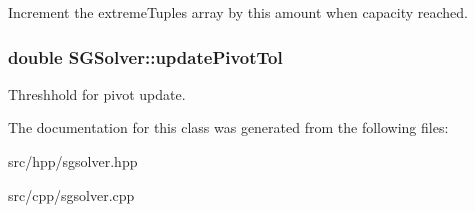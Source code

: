 Increment the extreme\+Tuples array by this amount when capacity reached. \hypertarget{class_s_g_solver_a04879f5038b676bd1a947966750532ad}{
\subsubsection[{update\+Pivot\+Tol}]{\setlength{\rightskip}{0pt plus 5cm}double S\+G\+Solver\+::update\+Pivot\+Tol\hspace{0.3cm}{\ttfamily [private]}}}\label{class_s_g_solver_a04879f5038b676bd1a947966750532ad}
Threshhold for pivot update. 

The documentation for this class was generated from the following files\+:\begin{DoxyCompactItemize}
\item 
src/hpp/sgsolver.\+hpp\item 
src/cpp/sgsolver.\+cpp\end{DoxyCompactItemize}
